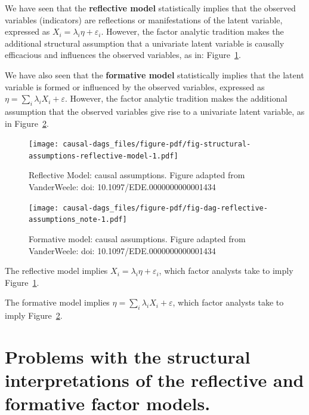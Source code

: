 \documentclass[
  singlecolumn]{report}
\begin{document}
We have seen that the \textbf{reflective model} statistically implies
that the observed variables (indicators) are reflections or
manifestations of the latent variable, expressed as
\(X_i = \lambda_i \eta + \varepsilon_i\). However, the factor analytic
tradition makes the additional structural assumption that a univariate
latent variable is causally efficacious and influences the observed
variables, as in:
Figure~\ref{fig-structural-assumptions-reflective-model}.

We have also seen that the \textbf{formative model} statistically
implies that the latent variable is formed or influenced by the observed
variables, expressed as \(\eta = \sum_i\lambda_i X_i + \varepsilon\).
However, the factor analytic tradition makes the additional assumption
that the observed variables give rise to a univariate latent variable,
as in Figure~\ref{fig-dag-reflective-assumptions_note}.

\begin{figure}

{\centering \texttt{[image: causal-dags\_files/figure-pdf/fig-structural-assumptions-reflective-model-1.pdf]}

}

\caption{\label{fig-structural-assumptions-reflective-model}Reflective
Model: causal assumptions. Figure adapted from VanderWeele: doi:
10.1097/EDE.0000000000001434}

\end{figure}

\begin{figure}

{\centering \texttt{[image: causal-dags\_files/figure-pdf/fig-dag-reflective-assumptions\_note-1.pdf]}

}

\caption{\label{fig-dag-reflective-assumptions_note}Formative model:
causal assumptions. Figure adapted from VanderWeele: doi:
10.1097/EDE.0000000000001434}

\end{figure}

The reflective model implies \(X_i = \lambda_i \eta + \varepsilon_i\),
which factor analysts take to imply
Figure~\ref{fig-structural-assumptions-reflective-model}.

The formative model implies
\(\eta = \sum_i\lambda_i X_i + \varepsilon\), which factor analysts take
to imply Figure~\ref{fig-dag-reflective-assumptions_note}.

\hypertarget{problems-with-the-structural-interpretations-of-the-reflective-and-formative-factor-models.}{%
\section{Problems with the structural interpretations of the reflective
and formative factor
models.}\label{problems-with-the-structural-interpretations-of-the-reflective-and-formative-factor-models.}}
\end{document}
